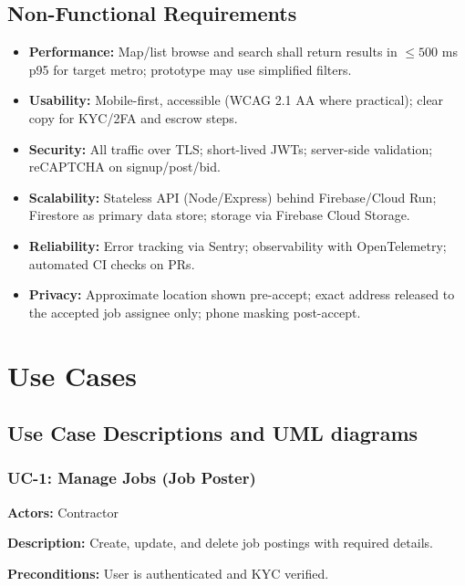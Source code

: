 \documentclass[11pt]{article}
\begin{document}
\subsection{Non-Functional Requirements}
\begin{itemize}[leftmargin=1.4em]
  \item \textbf{Performance:} Map/list browse and search shall return results in \(\leq 500\) ms p95 for target metro; prototype may use simplified filters.
  \item \textbf{Usability:} Mobile-first, accessible (WCAG 2.1 AA where practical); clear copy for KYC/2FA and escrow steps.
  \item \textbf{Security:} All traffic over TLS; short-lived JWTs; server-side validation; reCAPTCHA on signup/post/bid.
  \item \textbf{Scalability:} Stateless API (Node/Express) behind Firebase/Cloud Run; Firestore as primary data store; storage via Firebase Cloud Storage.
  \item \textbf{Reliability:} Error tracking via Sentry; observability with OpenTelemetry; automated CI checks on PRs.
  \item \textbf{Privacy:} Approximate location shown pre-accept; exact address released to the accepted job assignee only; phone masking post-accept.
\end{itemize}

\section{Use Cases}
\subsection{Use Case Descriptions and UML diagrams}

\subsubsection*{UC-1: Manage Jobs (Job Poster)}
\textbf{Actors:} Contractor \par
\textbf{Description:} Create, update, and delete job postings with required details.\par
\textbf{Preconditions:} User is authenticated and KYC verified.\par
\end{document}

